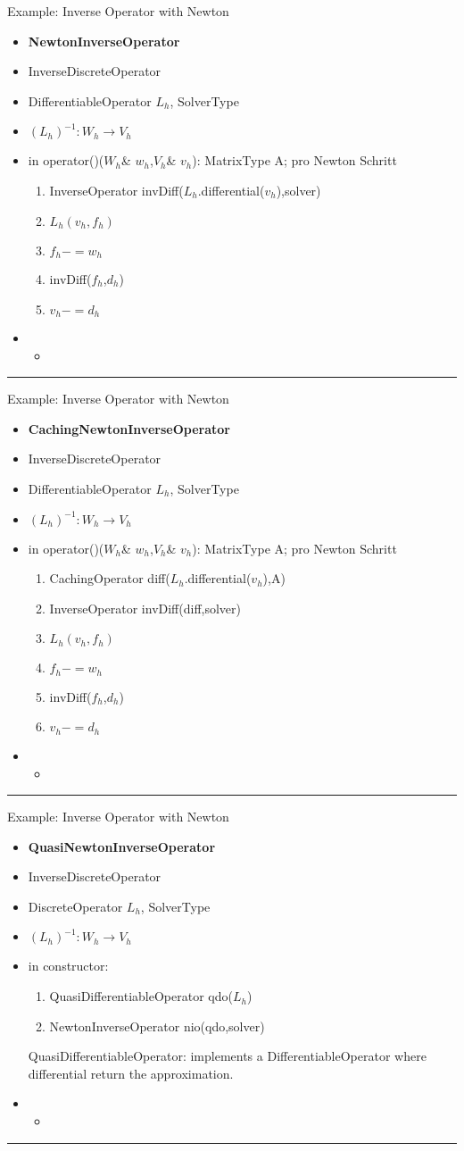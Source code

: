 \documentclass[10pt,a4paper]{article}
\newenvironment{interface}[5]%
{\begin{itemize}
 \item[Interface] {\bf #1}
 \item[is-a] #2 
 \item[argument] #3
 \item[models] #4
 \item[concept] #5
 \item[Methods and typedefs] 
\begin{itemize}}%
{\end{itemize}\end{itemize}\rule{\textwidth}{.4pt}}
\begin{document}
\newpage
Example: Inverse Operator with Newton
\begin{interface}{NewtonInverseOperator}{InverseDiscreteOperator}%
                 {DifferentiableOperator $L_h$, SolverType}%
                 {$(L_h)^{-1}:W_h\to V_h$}%
                 {in operator()($W_h$\& $w_h$,$V_h$\& $v_h$):
MatrixType A;
pro Newton Schritt
\begin{enumerate}
\item InverseOperator invDiff($L_h$.differential($v_h$),solver)
\item $L_h(v_h,f_h)$
\item $f_h-=w_h$
\item invDiff($f_h$,$d_h$)
\item $v_h-=d_h$
\end{enumerate}
}\item
\end{interface}
Example: Inverse Operator with Newton
\begin{interface}{CachingNewtonInverseOperator}{InverseDiscreteOperator}%
                 {DifferentiableOperator $L_h$, SolverType}%
                 {$(L_h)^{-1}:W_h\to V_h$}%
                 {in operator()($W_h$\& $w_h$,$V_h$\& $v_h$):
MatrixType A;
pro Newton Schritt
\begin{enumerate}
\item CachingOperator diff($L_h$.differential($v_h$),A)
\item InverseOperator invDiff(diff,solver)
\item $L_h(v_h,f_h)$
\item $f_h-=w_h$
\item invDiff($f_h$,$d_h$)
\item $v_h-=d_h$
\end{enumerate}
}\item
\end{interface}
Example: Inverse Operator with Newton
\begin{interface}{QuasiNewtonInverseOperator}{InverseDiscreteOperator}%
                 {DiscreteOperator $L_h$, SolverType}%
                 {$(L_h)^{-1}:W_h\to V_h$}%
                 {in constructor:
\begin{enumerate}
\item QuasiDifferentiableOperator qdo($L_h$)
\item NewtonInverseOperator nio(qdo,solver)
\end{enumerate}
QuasiDifferentiableOperator: implements a DifferentiableOperator where
differential return the approximation.
}\item
\end{interface}
\end{document}
